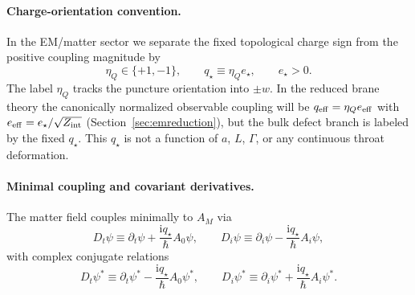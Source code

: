 \documentclass[11pt]{article}
\newcommand{\ii}{\mathrm{i}}
\newcommand{\etaQ}{\eta_Q}
\newcommand{\estar}{e_\star}
\newcommand{\eeff}{e_{\rm eff}}
\newcommand{\qstar}{q_\star}
\newcommand{\qeff}{q_{\rm eff}}
\newcommand{\Zint}{Z_{\rm int}}
\begin{document}
\paragraph{Charge-orientation convention.}
In the EM/matter sector we separate the fixed topological charge sign from the positive coupling magnitude by
\begin{equation}
\etaQ\in\{+1,-1\},
\qquad
\qstar\equiv \etaQ \estar,
\qquad
\estar>0.
\end{equation}
The label $\etaQ$ tracks the puncture orientation into $\pm w$. In the reduced brane theory the canonically normalized observable coupling will be $\qeff=\etaQ \eeff$ with $\eeff=\estar/\sqrt{\Zint}$ (Section~\ref{sec:emreduction}), but the bulk defect branch is labeled by the fixed $\qstar$. This $\qstar$ is not a function of $a$, $L$, $\Gamma$, or any continuous throat deformation.

\paragraph{Minimal coupling and covariant derivatives.}
The matter field couples minimally to $A_M$ via
\begin{equation}
D_t \psi \equiv \partial_t \psi + \frac{\ii \qstar}{\hbar}A_0\psi,
\qquad
D_i \psi \equiv \partial_i \psi - \frac{\ii \qstar}{\hbar}A_i\psi,
\end{equation}
with complex conjugate relations
\begin{equation}
D_t \psi^* \equiv \partial_t \psi^* - \frac{\ii \qstar}{\hbar}A_0\psi^*,
\qquad
D_i \psi^* \equiv \partial_i \psi^* + \frac{\ii \qstar}{\hbar}A_i\psi^*.
\end{equation}
\end{document}
